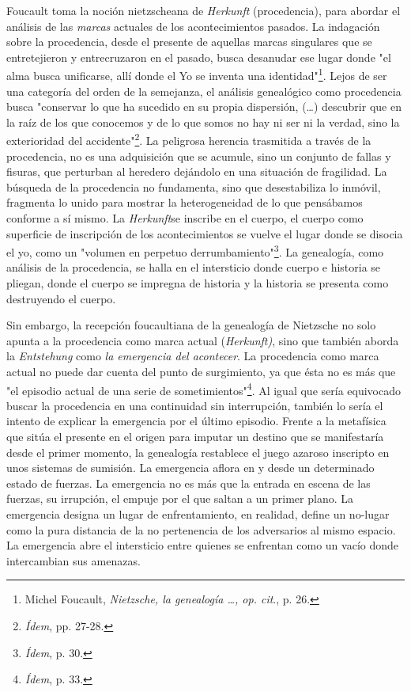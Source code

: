 \documentclass{book}
\begin{document}
Foucault toma la noción nietzscheana de \emph{Herkunft} (procedencia),
para abordar el análisis de las \emph{marcas} actuales de los
acontecimientos pasados. La indagación sobre la procedencia, desde el
presente de aquellas marcas singulares que se entretejieron y
entrecruzaron en el pasado, busca desanudar ese lugar donde "el alma
busca unificarse, allí donde el Yo se inventa una identidad"\footnote{Michel
  Foucault, \emph{Nietzsche, la genealogía \ldots, op. cit}., p. 26.}.
Lejos de ser una categoría del orden de la semejanza, el análisis
genealógico como procedencia busca "conservar lo que ha sucedido en su
propia dispersión, (\dots) descubrir que en la raíz de los que
conocemos y de lo que somos no hay ni ser ni la verdad, sino la
exterioridad del accidente"\footnote{\emph{Ídem}, pp. 27-28.}. La
peligrosa herencia trasmitida a través de la procedencia, no es una
adquisición que se acumule, sino un conjunto de fallas y fisuras, que
perturban al heredero dejándolo en una situación de fragilidad. La
búsqueda de la procedencia no fundamenta, sino que desestabiliza lo
inmóvil, fragmenta lo unido para mostrar la heterogeneidad de lo que
pensábamos conforme a sí mismo. La \emph{Herkunft}se inscribe en el
cuerpo, el cuerpo como superficie de inscripción de los acontecimientos
se vuelve el lugar donde se disocia el yo, como un "volumen en perpetuo
derrumbamiento"\footnote{\emph{Ídem}, p. 30.}. La genealogía, como
análisis de la procedencia, se halla en el intersticio donde cuerpo e
historia se pliegan, donde el cuerpo se impregna de historia y la
historia se presenta como destruyendo el cuerpo.

Sin embargo, la recepción foucaultiana de la genealogía de Nietzsche no
solo apunta a la procedencia como marca actual (\emph{Herkunft)}, sino
que también aborda la \emph{Entstehung} como \emph{la emergencia del
acontecer}. La procedencia como marca actual no puede dar cuenta del
punto de surgimiento, ya que ésta no es más que "el episodio actual de
una serie de sometimientos"\footnote{\emph{Ídem}, p. 33.}. Al igual que
sería equivocado buscar la procedencia en una continuidad sin
interrupción, también lo sería el intento de explicar la emergencia por
el último episodio. Frente a la metafísica que sitúa el presente en el
origen para imputar un destino que se manifestaría desde el primer
momento, la genealogía restablece el juego azaroso inscripto en unos
sistemas de sumisión. La emergencia aflora en y desde un determinado
estado de fuerzas. La emergencia no es más que la entrada en escena de
las fuerzas, su irrupción, el empuje por el que saltan a un primer
plano. La emergencia designa un lugar de enfrentamiento, en realidad,
define un no-lugar como la pura distancia de la no pertenencia de los
adversarios al mismo espacio. La emergencia abre el intersticio entre
quienes se enfrentan como un vacío donde intercambian sus amenazas.
\end{document}
